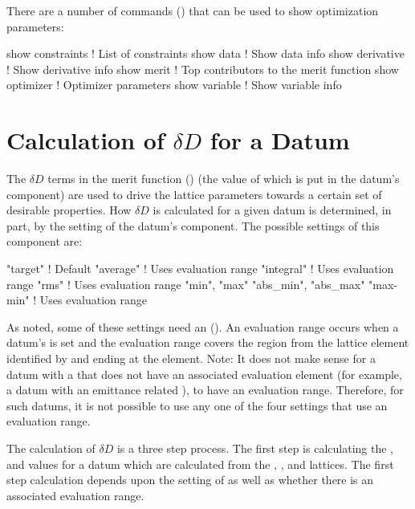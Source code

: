 There are a number of  commands () that can be used to show optimization
parameters:
\begin{example}
  show constraints    !  List of constraints 
  show data           !  Show data info
  show derivative     !  Show derivative info
  show merit          !  Top contributors to the merit function
  show optimizer      !  Optimizer parameters
  show variable       !  Show variable info
\end{example}

\section{Calculation of $\delta D$ for a Datum}
\label{s:del.d}

The $\delta D$ terms in the merit function () (the value of which is put in the datum's
 component) are used to drive the  lattice parameters towards a certain
set of desirable properties. How $\delta D$ is calculated for a given datum is determined, in part,
by the setting of the datum's  component. The possible settings of this component
are:
\begin{example}
  "target"                       ! Default
  "average"                      ! Uses evaluation range
  "integral"                     ! Uses evaluation range
  "rms"                          ! Uses evaluation range
  "min", "max"
  "abs_min", "abs_max"
  "max-min"                      ! Uses evaluation range
\end{example}
As noted, some of these settings need an  (). An evaluation
range occurs when a datum's  is set and the evaluation range covers the region
from the lattice element identified by  and ending at the  element.
Note: It does not make sense for a datum with a  that does not have an associated
evaluation element (for example, a datum with an emittance related ), to have an
evaluation range. Therefore, for such datums, it is not possible to use any one of the four
 settings that use an evaluation range.

The calculation of $\delta D$ is a three step process. The first step is calculating the
,  and  values for a datum which are calculated from the ,
, and  lattices. The first step calculation depends upon the setting of
 as well as whether there is an associated evaluation range.

